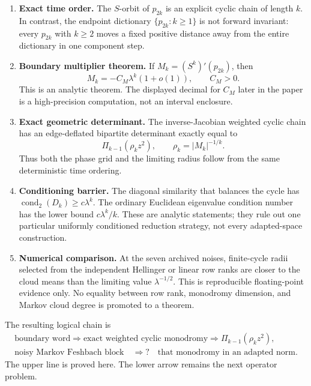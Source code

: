 \documentclass[11pt]{article}
\theoremstyle{definition}
\theoremstyle{remark}
\newcommand{\cond}{\operatorname{cond}_2}
\begin{document}
\begin{enumerate}[label=\textbf{M\arabic*.},leftmargin=3.2em]
 \item \textbf{Exact time order.}
 The $S$-orbit of $p_{2k}$ is an explicit cyclic chain of length $k$.
 In contrast, the endpoint dictionary
 $\{p_{2k}:k\ge1\}$ is not forward invariant: every $p_{2k}$ with $k\ge2$
 moves a fixed positive distance away from the entire dictionary in one
 component step.

 \item \textbf{Boundary multiplier theorem.}
 If $M_k=(S^k)'(p_{2k})$, then
 \begin{equation}\label{eq:intro-multiplier}
  M_k=-C_M\lambda^k(1+o(1)),
  \qquad C_M>0.
 \end{equation}
 This is an analytic theorem.  The displayed decimal for $C_M$ later in the
 paper is a high-precision computation, not an interval enclosure.

 \item \textbf{Exact geometric determinant.}
 The inverse-Jacobian weighted cyclic chain has an edge-deflated bipartite
 determinant exactly equal to
 \begin{equation}\label{eq:intro-exact-geometric}
  \Pi_{k-1}(\rho_kz^2),
  \qquad \rho_k=|M_k|^{-1/k}.
 \end{equation}
 Thus both the phase grid and the limiting radius follow from the same
 deterministic time ordering.

 \item \textbf{Conditioning barrier.}
 The diagonal similarity that balances the cycle has
 $\cond(D_k)\ge c\lambda^k$.  The ordinary Euclidean eigenvalue condition
 number has the lower bound $c\lambda^k/k$.  These are analytic statements;
 they rule out one particular uniformly conditioned reduction strategy, not
 every adapted-space construction.

 \item \textbf{Numerical comparison.}
 At the seven archived noises, finite-cycle radii selected from the independent
 Hellinger or linear row ranks are closer to the cloud means than the limiting
 value $\lambda^{-1/2}$.  This is reproducible floating-point evidence only.
 No equality between row rank, monodromy dimension, and Markov cloud degree is
 promoted to a theorem.
\end{enumerate}

The resulting logical chain is
\begin{equation}\label{eq:logical-chain}
 \boxed{
 \begin{gathered}
 \text{boundary word}
 \Longrightarrow
 \text{exact weighted cyclic monodromy}
 \Longrightarrow
 \Pi_{k-1}(\rho_kz^2),\\
 \text{noisy Markov Feshbach block}
 \quad\Longrightarrow?\quad
 \text{that monodromy in an adapted norm}.
 \end{gathered}}
\end{equation}
The upper line is proved here.  The lower arrow remains the next operator
problem.
\end{document}
